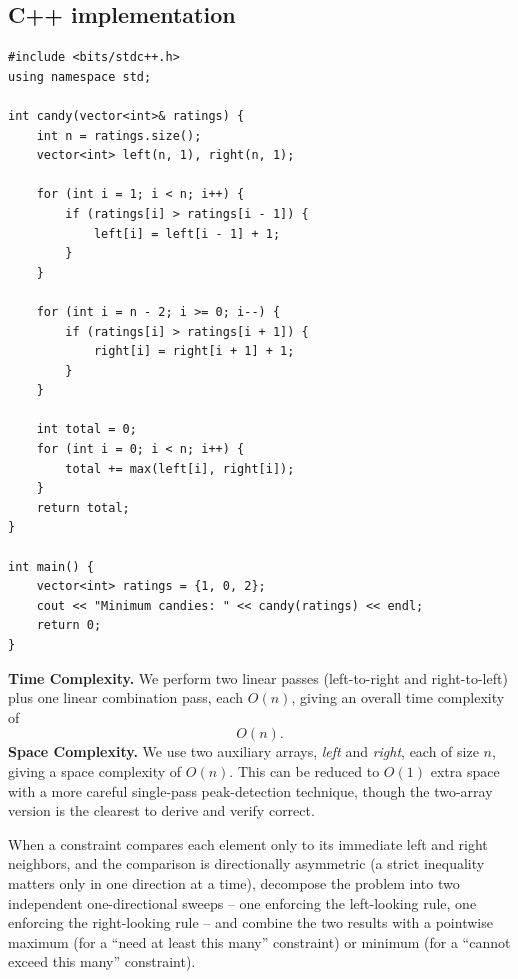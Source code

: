 \subsection*{C++ implementation}

\begin{lstlisting}
#include <bits/stdc++.h>
using namespace std;

int candy(vector<int>& ratings) {
    int n = ratings.size();
    vector<int> left(n, 1), right(n, 1);

    for (int i = 1; i < n; i++) {
        if (ratings[i] > ratings[i - 1]) {
            left[i] = left[i - 1] + 1;
        }
    }

    for (int i = n - 2; i >= 0; i--) {
        if (ratings[i] > ratings[i + 1]) {
            right[i] = right[i + 1] + 1;
        }
    }

    int total = 0;
    for (int i = 0; i < n; i++) {
        total += max(left[i], right[i]);
    }
    return total;
}

int main() {
    vector<int> ratings = {1, 0, 2};
    cout << "Minimum candies: " << candy(ratings) << endl;
    return 0;
}
\end{lstlisting}

\begin{complexitybox}
\textbf{Time Complexity.} We perform two linear passes (left-to-right and
right-to-left) plus one linear combination pass, each $O(n)$, giving an
overall time complexity of
\[
  O(n).
\]
\textbf{Space Complexity.} We use two auxiliary arrays, \textit{left} and
\textit{right}, each of size $n$, giving a space complexity of $O(n)$. This
can be reduced to $O(1)$ extra space with a more careful single-pass
peak-detection technique, though the two-array version is the clearest to
derive and verify correct.
\end{complexitybox}

\begin{takeawaybox}
When a constraint compares each element only to its immediate left and
right neighbors, and the comparison is directionally asymmetric (a strict
inequality matters only in one direction at a time), decompose the problem
into two independent one-directional sweeps -- one enforcing the
left-looking rule, one enforcing the right-looking rule -- and combine the
two results with a pointwise maximum (for a ``need at least this many''
constraint) or minimum (for a ``cannot exceed this many'' constraint).
\end{takeawaybox}
